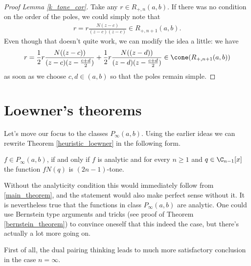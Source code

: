 \begin{proof}[Proof Lemma \ref{k_tone_cor}]
	Take any $r \in R_{+, n}(a, b)$. If there was no condition on the order of the poles, we could simply note that
	\begin{align*}
		r = r \frac{N(z - c)}{(z - c) (z - c)} \in R_{+, n + 1}(a, b).
	\end{align*}
	Even though that doesn't quite work, we can modify the idea a little: we have
	\begin{align*}
		r = \frac{1}{2} r \frac{N((z - c))}{(z - c) (z - \frac{c + d}{2})} +  \frac{1}{2} r \frac{N((z - d))}{(z - d) (z - \frac{c + d}{2})} \in \cone(R_{+, n + 1}(a, b))
	\end{align*}
	as soon as we choose $c, d \in (a, b)$ so that the poles remain simple.
\end{proof}

\section{Loewner's theorems}\label{loewner_first_touch}

Let's move our focus to the classes $P_{\infty}(a, b)$. Using the earlier ideas we can rewrite Theorem \ref{heuristic_loewner} in the following form.

\begin{lause}\label{better_loewner}
	$f \in P_{\infty}(a, b)$, if and only if $f$ is analytic and for every $n \geq 1$ and $q \in \C_{n - 1}[x]$ the function $f N(q)$ is $(2 n - 1)$-tone.
\end{lause}

Without the analyticity condition this would immediately follow from \ref{main_theorem}, and the statement would also make perfect sense without it. It is nevertheless true that the functions in class $P_{\infty}(a, b)$ are analytic. One could use Bernstein type arguments and tricks (see proof of Theorem \ref{bernstein_theorem}) to convince oneself that this indeed the case, but there's actually a lot more going on.

First of all, the dual pairing thinking leads to much more satisfactory conclusion in the case $n = \infty$.

